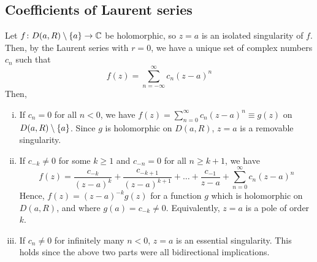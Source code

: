 \subsection{Coefficients of Laurent series}
Let \( f \colon D(a,R) \setminus \qty{a} \to \mathbb C \) be holomorphic, so \( z = a \) is an isolated singularity of \( f \).
Then, by the Laurent series with \( r = 0 \), we have a unique set of complex numbers \( c_n \) such that
\[ f(z) = \sum_{n=-\infty}^\infty c_n (z-a)^n \]
Then,
\begin{enumerate}[(i)]
	\item If \( c_n = 0 \) for all \( n < 0 \), we have \( f(z) = \sum_{n=0}^\infty c_n (z-a)^n \equiv g(z) \) on \( D(a,R) \setminus \qty{a} \).
	Since \( g \) is holomorphic on \( D(a,R) \), \( z = a \) is a removable singularity.
	\item If \( c_{-k} \neq 0 \) for some \( k \geq 1 \) and \( c_{-n} = 0 \) for all \( n \geq k + 1 \), we have
	\[ f(z) = \frac{c_{-k}}{(z-a)^k} + \frac{c_{-k+1}}{(z-a)^{k+1}} + \dots + \frac{c_{-1}}{z-a} + \sum_{n=0}^\infty c_n (z-a)^n \]
	Hence, \( f(z) = (z-a)^{-k} g(z) \) for a function \( g \) which is holomorphic on \( D(a,R) \), and where \( g(a) = c_{-k} \neq 0 \).
	Equivalently, \( z = a \) is a pole of order \( k \).
	\item If \( c_n \neq 0 \) for infinitely many \( n < 0 \), \( z = a \) is an essential singularity.
	This holds since the above two parts were all bidirectional implications.
\end{enumerate}

